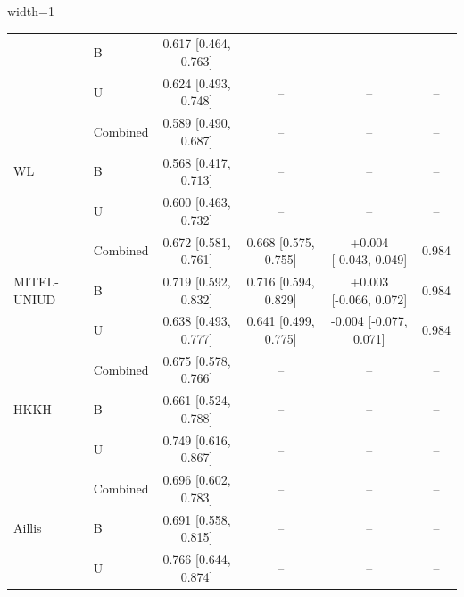 \begin{table}[H]
\begin{adjustbox}{width=1\textwidth}
\begin{tabular}{llcccc}
   & B & 0.617 [0.464, 0.763] & -- & -- & -- \\
   & U & 0.624 [0.493, 0.748] & -- & -- & -- \\
  \hline
  \multirow{3}{*}{WL} & Combined & 0.589 [0.490, 0.687] & -- & -- & -- \\
   & B & 0.568 [0.417, 0.713] & -- & -- & -- \\
   & U & 0.600 [0.463, 0.732] & -- & -- & -- \\
  \hline
  \multirow{3}{*}{MITEL-UNIUD} & Combined & 0.672 [0.581, 0.761] & 0.668 [0.575, 0.755] & +0.004 [-0.043, 0.049] & 0.984 \\
   & B & 0.719 [0.592, 0.832] & 0.716 [0.594, 0.829] & +0.003 [-0.066, 0.072] & 0.984 \\
   & U & 0.638 [0.493, 0.777] & 0.641 [0.499, 0.775] & -0.004 [-0.077, 0.071] & 0.984 \\
  \hline
  \multirow{3}{*}{HKKH} & Combined & 0.675 [0.578, 0.766] & -- & -- & -- \\
   & B & 0.661 [0.524, 0.788] & -- & -- & -- \\
   & U & 0.749 [0.616, 0.867] & -- & -- & -- \\
  \hline
  \multirow{3}{*}{Aillis} & Combined & 0.696 [0.602, 0.783] & -- & -- & -- \\
   & B & 0.691 [0.558, 0.815] & -- & -- & -- \\
   & U & 0.766 [0.644, 0.874] & -- & -- & -- \\
  \hline
  \end{tabular}
  \end{adjustbox}
  \label{tab:task2_robustness_nif_unified_auc}
\end{table}
